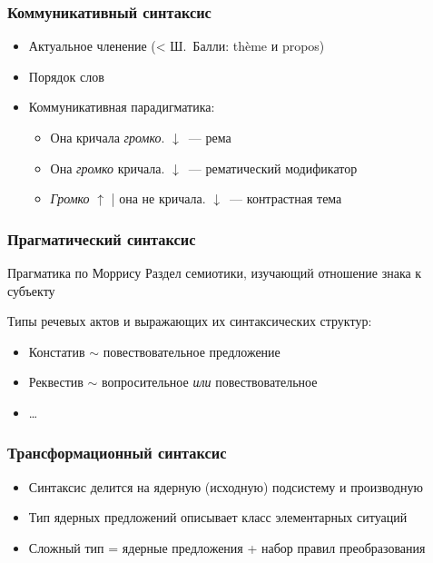 \begin{frame}
  \frametitle{Коммуникативный синтаксис}

  \begin{itemize}
    \item Актуальное членение (< Ш.~Балли: thème и propos)
    \item Порядок слов
    \item Коммуникативная парадигматика: \begin{itemize}
      \item Она кричала \textit{громко}. $\downarrow$~--- рема
      \item Она \textit{громко} кричала. $\downarrow$~--- рематический модификатор
      \item \textit{Громко} $\uparrow$ | она не кричала. $\downarrow$~--- контрастная тема
    \end{itemize}
  \end{itemize}
\end{frame}

\begin{frame}
  \frametitle{Прагматический синтаксис}

  \begin{block}{Прагматика по Моррису}
    Раздел семиотики, изучающий отношение знака к субъекту
  \end{block}

  \vfill

  Типы речевых актов и выражающих их синтаксических структур:
  \begin{itemize}
    \item Констатив $\sim$ повествовательное предложение
    \item Реквестив $\sim$ вопросительное \textit{или} повествовательное
    \item \ldots
  \end{itemize}
\end{frame}

\begin{frame}
  \frametitle{Трансформационный синтаксис}

  \begin{itemize}
    \item Синтаксис делится на ядерную (исходную) подсистему и производную
    \item Тип ядерных предложений описывает класс элементарных ситуаций
    \item Сложный тип = ядерные предложения + набор правил преобразования
  \end{itemize}
\end{frame}

